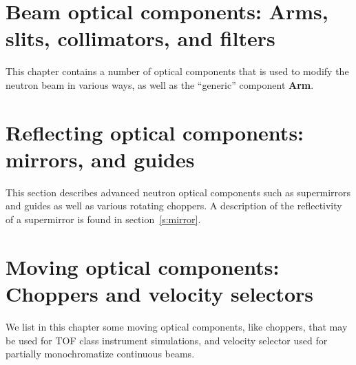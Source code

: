 
\chapter{Beam optical components:
Arms, slits, collimators, and filters}
This chapter contains a number of optical components
that is used to modify the neutron beam in various ways,
as well as the ``generic'' component \textbf{Arm}.











\newpage




\newpage
\chapter{Reflecting optical components: mirrors, and guides}

This section describes advanced neutron optical
components such as supermirrors and guides as well as various rotating choppers.
A description of the reflectivity of a supermirror is found
in section~\ref{s:mirror}.





\chapter{Moving optical components:
Choppers and velocity selectors}
We list in this chapter some moving optical components,
like choppers, that may be used for TOF class instrument simulations,
and velocity selector used for partially monochromatize continuous beams.



\newpage




\newpage




